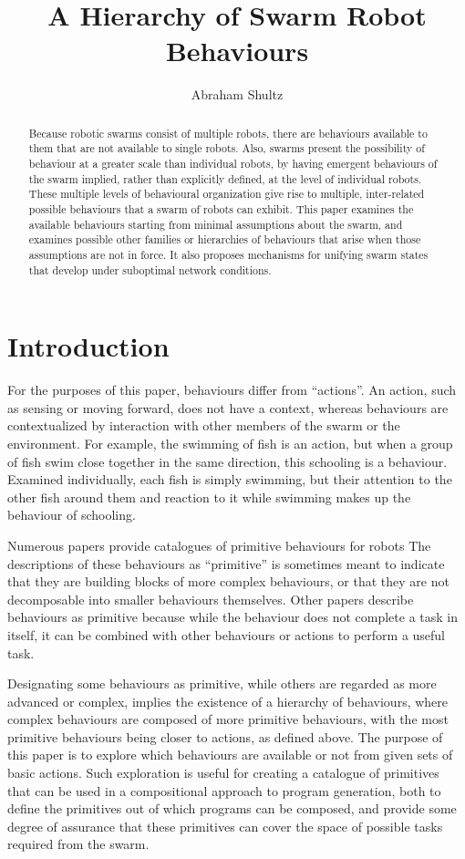 \documentclass[]{article}
\title{A Hierarchy of Swarm Robot Behaviours}
\author{Abraham Shultz}
\begin{document}
\maketitle

\begin{abstract}
Because robotic swarms consist of multiple robots, there are behaviours available to them that are not available to single robots. Also, swarms present the possibility of behaviour at a greater scale than individual robots, by having emergent behaviours of the swarm implied, rather than explicitly defined, at the level of individual robots. These multiple levels of behavioural organization give rise to multiple, inter-related possible behaviours that a swarm of robots can exhibit. This paper examines the available behaviours starting from minimal assumptions about the swarm, and examines possible other families or hierarchies of behaviours that arise when those assumptions are not in force. It also proposes mechanisms for unifying swarm states that develop under suboptimal network conditions. 

\end{abstract}

\section{Introduction}

For the purposes of this paper, behaviours differ from ``actions''. 
An action, such as sensing or moving forward, does not have a context, whereas behaviours are contextualized by interaction with other members of the swarm or the environment.
For example, the swimming of fish is an action, but when a group of fish swim close together in the same direction, this schooling is a behaviour. 
Examined individually, each fish is simply swimming, but their attention to the other fish around them and reaction to it while swimming makes up the behaviour of schooling. 

Numerous papers provide catalogues of primitive behaviours for robots 
The descriptions of these behaviours as ``primitive'' is sometimes meant to indicate that they are building blocks of more complex behaviours, or that they are not decomposable into smaller behaviours themselves. 
Other papers describe behaviours as primitive because while the behaviour does not complete a task in itself, it can be combined with other behaviours or actions to perform a useful task. 

Designating some behaviours as primitive, while others are regarded as more advanced or complex, implies the existence of a hierarchy of behaviours, where complex behaviours are composed of more primitive behaviours, with the most primitive behaviours being closer to actions, as defined above. 
The purpose of this paper is to explore which behaviours are available or not from given sets of basic actions.
Such exploration is useful for creating a catalogue of primitives that can be used in a compositional approach to program generation, both to define the primitives out of which programs can be composed, and provide some degree of assurance that these primitives can cover the space of possible tasks required from the swarm. 
\end{document}
